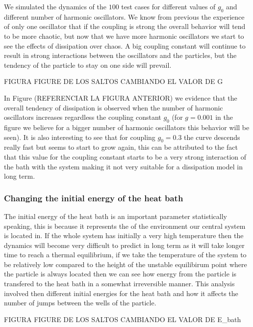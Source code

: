 We simulated the dynamics of the $100$ test cases for different values of $g_0$ and different number of harmonic oscillators. We know from previous the experience of only one oscillator that if the coupling is strong the overall behavior will tend to be more chaotic, but now that we have more harmonic oscillators we start to see the effects of dissipation over chaos. A big coupling constant will continue to result in strong interactions between the oscillators and the particles, but the tendency of the particle to stay on one side will prevail.

FIGURA FIGURE DE LOS SALTOS CAMBIANDO EL VALOR DE G\par 

In Figure (REFERENCIAR LA FIGURA ANTERIOR) we evidence that the overall tendency of dissipation is observed when the number of harmonic oscillators increases regardless the coupling constant $g_0$ (for $g=0.001$ in the figure we believe for a bigger number of harmonic oscillators this behavior will be seen). It is also interesting to see that for coupling $g_0=0.3$ the curve descends really fast but seems to start to grow again, this can be attributed to the fact that this value for the coupling constant starts to be a very strong interaction of the bath with the system making it not very suitable for a dissipation model in long term. 


\subsubsection{Changing the initial energy of the heat bath}
The initial energy of the heat bath is an important parameter statistically speaking, this is because it represents the  of the environment our central system is located in. If the whole system has initially a very high temperature then the dynamics will become very difficult to predict in long term as it will take longer time to reach a thermal equilibrium, if we take the temperature of the system to be relatively low compared to the height of the unstable equilibirum point where the particle is always located then we can see how energy from the particle is transfered to the heat bath in a somewhat irreversible manner. This analysis involved then different initial energies for the heat bath and how it affects the number of jumps between the wells of the particle.\par 

FIGURA FIGURE DE LOS SALTOS CAMBIANDO EL VALOR DE E_bath\par 

